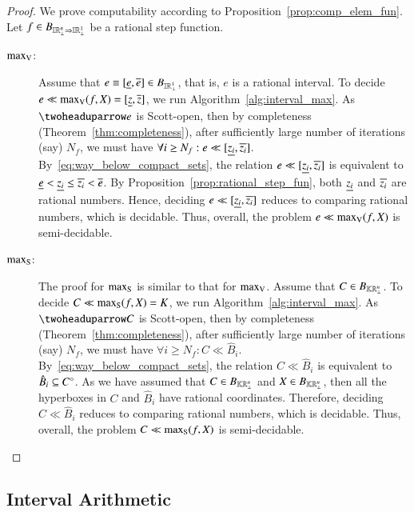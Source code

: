 \documentclass[11pt,times]{article}
\begin{document}
\begin{proof}
  We prove computability according to
  Proposition~\ref{prop:comp_elem_fun}. Let
  $f \in B_{\intvaldom[\R^n\lift] \Rightarrow \intvaldom[\R^1\lift]}$
  be a rational step function.

  \begin{description}
  \item[$\maxV$:] Assume that
    $e \equiv [\lep[e], \uep[e]]\in B_{\intvaldom[\R^1\lift]}$, that
    is, $e$ is a rational interval. To decide
    $e \ll \maxV(f, X) = [\lep[z], \uep[z]]$, we run
    Algorithm~\ref{alg:interval_max}. As $\wayaboves{e}$ is
    Scott-open, then by completeness (Theorem~\ref{thm:completeness}),
    after sufficiently large number of iterations (say) $N_f$, we must
    have $\forall i \geq N_f: e \ll [{\lep[z_i],
      \uep[z_i]}]$. By~\eqref{eq:way_below_compact_sets}, the relation
    $e \ll [{\lep[z_i], \uep[z_i]}]$ is equivalent to
    $\lep[e] < \lep[z_i] \leq \uep[z_i] < \uep[e]$. By
    Proposition~\ref{prop:rational_step_fun}, both $\lep[z_i]$ and
    $\uep[z_i]$ are rational numbers. Hence, deciding
    $e \ll [{\lep[z_i], \uep[z_i]}]$ reduces to comparing rational
    numbers, which is decidable. Thus, overall, the problem
    $e \ll \maxV(f, X)$ is semi-decidable.
%

  \item[$\maxS$:] The proof for $\maxS$ is similar to that for
    $\maxV$. Assume that $C \in B_{\kCPPO{\R^n\lift}}$. To decide
    $C \ll \maxS(f, X) = K$, we run
    Algorithm~\ref{alg:interval_max}. As $\wayaboves{C}$ is
    Scott-open, then by completeness (Theorem~\ref{thm:completeness}),
    after sufficiently large number of iterations (say) $N_f$, we must
    have $\forall i \geq N_f: C \ll
    \hat{B}_i$. By~\eqref{eq:way_below_compact_sets}, the relation
    $C \ll \hat{B}_i$ is equivalent to
    $\hat{B}_i \subseteq \interiorOf{C}$. As we have assumed that
    $C \in B_{\kCPPO{\R^n\lift}}$ and $X \in B_{\kCPPO{\R^n\lift}}$,
    then all the hyperboxes in $C$ and $\hat{B}_i$ have rational
    coordinates. Therefore, deciding $C \ll \hat{B}_i$ reduces to
    comparing rational numbers, which is decidable. Thus, overall, the
    problem $C \ll \maxS(f, X)$ is semi-decidable.
  \end{description}
\end{proof}





  \subsection{Interval Arithmetic}
  \label{subsec:interval_arithmetic}
\end{document}

